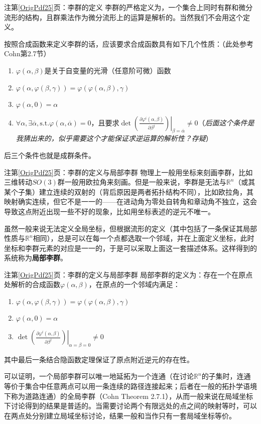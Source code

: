 \documentclass{beamer}
\newcommand{\refpage}[1]{注第\ref{OrigPdf#1}页}%
\newcommand{\pp}[2]{\frac{\partial #1}{\partial #2}}
\newcommand{\ppat}[3]{\left.\left(\pp{#1}{#2}\right)\right|_{#3}}
\begin{document}
\begin{frame}{\refpage{25}：李群的定义}
	李群的严格定义为，一个集合上同时有群和微分流形的结构，且群乘法作为微分流形上的运算是解析的。当然我们不会用这个定义。
	
	按照合成函数来定义李群的话，应该要求合成函数具有如下几个性质：（此处参考Cohn第2.7节）
	\begin{enumerate}
		\item $\varphi(\alpha,\beta)$是关于自变量的光滑（任意阶可微）函数
		\item $\varphi(\alpha,\varphi(\beta,\gamma))=\varphi(\varphi(\alpha,\beta),\gamma)$
		\item $\varphi(\alpha,0)=\alpha$
		\item $\forall \alpha,\exists\overline{\alpha}, \text{s.t.}\varphi(\alpha,\overline{\alpha})=0$，且要求$\det\ppat{\varphi^i(\alpha,\beta)}{\beta^j}{\beta=\overline{\alpha}}\neq 0$（\textit{后面这个条件是我猜出来的，似乎需要这个才能保证求逆运算的解析性？存疑}）
	\end{enumerate}
	后三个条件也就是成群条件。
\end{frame}

\begin{frame}{\refpage{25}：李群的定义与局部李群}
	物理上一般用坐标来刻画李群，比如三维转动$SO(3)$群一般用欧拉角来刻画。但是一般来说，李群是无法与$\mathbb R^n$（或其某个子集）建立连续的双射的（背后原因是两者拓扑结构不同），比如欧拉角，其映射确实连续，但它不是一一的——在进动角为零处自转角和章动角不独立，这会导致这点附近出现一些不好的现象，比如用坐标表述的逆元不唯一。
	
	虽然一般来说无法定义全局坐标，但根据流形的定义（其中包括了一条保证其局部性质与$\mathbb R^n$相同），总是可以在每一个点都选取一个邻域，并在上面定义坐标，此时坐标和李群元素的对应是一一的，于是可以采取上面这一套描述体系。这样得到的系统称为\textbf{局部李群}。
\end{frame}

\begin{frame}{\refpage{25}：李群的定义与局部李群}
	局部李群的定义为：存在一个在原点处解析的合成函数$\varphi(\alpha,\beta)$，在原点的一个邻域内满足：
	\begin{enumerate}
		\item $\varphi(\alpha,\varphi(\beta,\gamma))=\varphi(\varphi(\alpha,\beta),\gamma)$
		\item $\varphi(\alpha,0)=\alpha$
		\item $\det\ppat{\varphi^i(\alpha,\beta)}{\beta^j}{\alpha=\beta=0}\neq 0$
	\end{enumerate}
	其中最后一条结合隐函数定理保证了原点附近逆元的存在性。
	
	可以证明，一个局部李群可以唯一地延拓为一个连通（在讨论$\mathbb R^n$的子集时，连通等价于集合中任意两点可以用一条连续的路径连接起来；后者在一般的拓扑学语境下称为道路连通）的全局李群（Cohn Theorem 2.7.1），从而一般来说在局域坐标下讨论得到的结果是普适的。当需要讨论两个有限远处的点之间的映射等时，可以在两点处分别建立局域坐标讨论，结果一般和当作只有一套局域坐标等价。
\end{frame}
\end{document}
